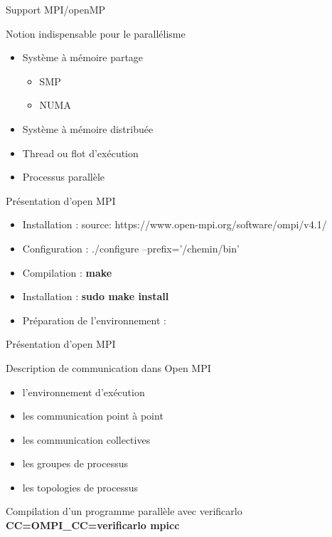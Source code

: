 \documentclass{beamer}
\begin{document}
\begin{frame}{Support MPI/openMP}
    \begin{block}{Notion indispensable pour le parallélisme}
      \begin{itemize}
          \item Système à mémoire partage
            \begin{itemize}
                \item SMP
                \item NUMA
            \end{itemize}
          \item Système à mémoire distribuée
          \item Thread ou flot d'exécution
          \item Processus
          \Calcul parallèle
      \end{itemize}
    \end{block}
    
    \begin{block}{Présentation d'open MPI}
      \begin{itemize}
          \item Installation : source: https://www.open-mpi.org/software/ompi/v4.1/
          \item Configuration : ./configure --prefix='/chemin/bin'
          \item Compilation : \textbf{make}
          \item Installation : \textbf{sudo make install}
          \item Préparation de l'environnement : 
      \end{itemize}
    \end{block}
\end{frame}

\begin{frame}{Présentation d'open MPI}
    \begin{block}{Description de communication dans Open MPI}
      \begin{itemize}
          \item l’environnement d’exécution
          \item les communication point à point
          \item les communication collectives
          \item les groupes de processus
          \item les topologies de processus
      \end{itemize}
    \end{block}
    
    \begin{block}{Compilation d’un programme parallèle avec verificarlo}
      \textbf{CC=OMPI\_CC=verificarlo mpicc}
    \end{block}
\end{frame}
\end{document}
